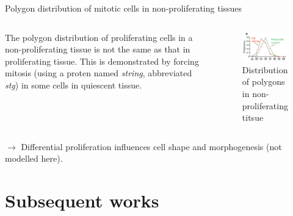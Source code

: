 \documentclass[aspectratio=169, 10pt]{beamer}
\begin{document}
\begin{frame}[fragile]{Polygon distribution of mitotic cells in non-proliferating tissues}
  \begin{columns}[onlytextwidth]
    The polygon distribution of proliferating cells in a non-proliferating tissue is not the same as that in proliferating tissue. This is demonstrated by forcing mitosis (using a proten named \emph{string}, abbreviated \emph{stg}) in some cells in quiescent tissue.
    \begin{figure}
      \centering
      \includegraphics[width=\textwidth]{figures/fig3e.png}
      \caption{Distribution of polygons in non-proliferating titsue}
    \end{figure}
  \end{columns}
  $\rightarrow$ Differential proliferation influences cell shape and morphogenesis (not modelled here).
\end{frame}

\section{Subsequent works}
\end{document}
